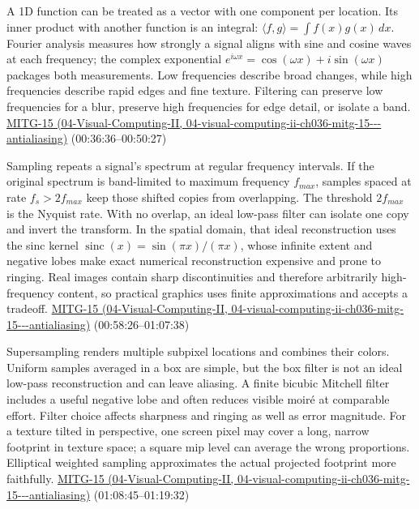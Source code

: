 A 1D function can be treated as a vector with one component per location. Its inner product with another function is an integral: \(\langle f,g\rangle=\int f(x)g(x)\,dx\). Fourier analysis measures how strongly a signal aligns with sine and cosine waves at each frequency; the complex exponential \(e^{i\omega x}=\cos(\omega x)+i\sin(\omega x)\) packages both measurements. Low frequencies describe broad changes, while high frequencies describe rapid edges and fine texture. Filtering can preserve low frequencies for a blur, preserve high frequencies for edge detail, or isolate a band. \href{../04-Visual-Computing-II/main.pdf\#nameddest=04-visual-computing-ii-ch036-mitg-15---antialiasing}{MITG-15 (04-Visual-Computing-II, 04-visual-computing-ii-ch036-mitg-15-\/-\/-antialiasing)} (00:36:36--00:50:27)

Sampling repeats a signal's spectrum at regular frequency intervals. If the original spectrum is band-limited to maximum frequency \(f_{max}\), samples spaced at rate \(f_s>2f_{max}\) keep those shifted copies from overlapping. The threshold \(2f_{max}\) is the Nyquist rate. With no overlap, an ideal low-pass filter can isolate one copy and invert the transform. In the spatial domain, that ideal reconstruction uses the sinc kernel \(\operatorname{sinc}(x)=\sin(\pi x)/(\pi x)\), whose infinite extent and negative lobes make exact numerical reconstruction expensive and prone to ringing. Real images contain sharp discontinuities and therefore arbitrarily high-frequency content, so practical graphics uses finite approximations and accepts a tradeoff. \href{../04-Visual-Computing-II/main.pdf\#nameddest=04-visual-computing-ii-ch036-mitg-15---antialiasing}{MITG-15 (04-Visual-Computing-II, 04-visual-computing-ii-ch036-mitg-15-\/-\/-antialiasing)} (00:58:26--01:07:38)

Supersampling renders multiple subpixel locations and combines their colors. Uniform samples averaged in a box are simple, but the box filter is not an ideal low-pass reconstruction and can leave aliasing. A finite bicubic Mitchell filter includes a useful negative lobe and often reduces visible moiré at comparable effort. Filter choice affects sharpness and ringing as well as error magnitude. For a texture tilted in perspective, one screen pixel may cover a long, narrow footprint in texture space; a square mip level can average the wrong proportions. Elliptical weighted sampling approximates the actual projected footprint more faithfully. \href{../04-Visual-Computing-II/main.pdf\#nameddest=04-visual-computing-ii-ch036-mitg-15---antialiasing}{MITG-15 (04-Visual-Computing-II, 04-visual-computing-ii-ch036-mitg-15-\/-\/-antialiasing)} (01:08:45--01:19:32)

